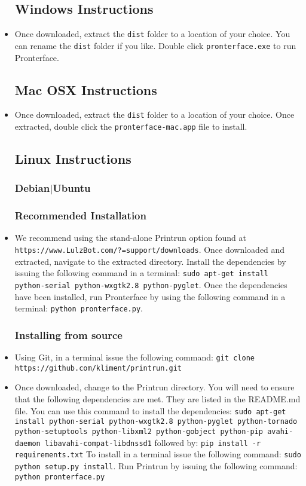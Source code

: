 \begin{itemize}
\subsection{Windows Instructions}
\item Once downloaded, extract the \texttt{dist} folder to a location of your choice. You can rename the \texttt{dist} folder if you like. Double click \texttt{pronterface.exe} to run Pronterface.


\subsection{Mac OSX Instructions}
\item Once downloaded, extract the \texttt{dist} folder to a location of your choice. Once extracted, double click the \texttt{pronterface-mac.app} file to install.

\subsection{Linux Instructions}
\subsubsection{Debian|Ubuntu}
\subsubsection{Recommended Installation}
\item We recommend using the stand-alone Printrun option found at \texttt{https://www.LulzBot.com/?=support/downloads}. Once downloaded and extracted, navigate to the extracted directory. Install the dependencies by issuing the following command in a terminal: \texttt{sudo apt-get install python-serial python-wxgtk2.8 python-pyglet}. Once the dependencies have been installed, run Pronterface by using the following command in a terminal: \texttt{python pronterface.py}.

\subsubsection{Installing from source}
\item Using Git, in a terminal issue the following command: \texttt{git clone https://github.com/kliment/printrun.git}
\item Once downloaded, change to the Printrun directory. You will need to ensure that the following dependencies are met. They are listed in the README.md file. You can use this command to install the dependencies: 
\texttt{sudo apt-get install python-serial python-wxgtk2.8 python-pyglet python-tornado python-setuptools python-libxml2 python-gobject python-pip avahi-daemon libavahi-compat-libdnssd1}
followed by:
\texttt{pip install -r requirements.txt}
To install in a terminal issue the following command:
\texttt{sudo python setup.py install}.
Run Printrun by issuing the following command:
\texttt{python pronterface.py}


\end{itemize}
